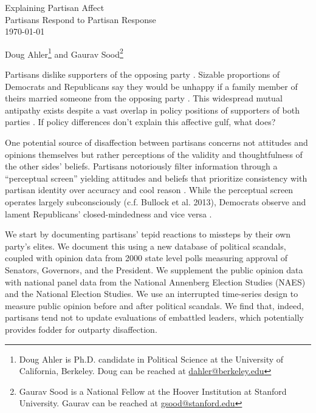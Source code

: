 \documentclass[12pt]{article}
\renewcommand{\thefootnote}{\fnsymbol{footnote}}
\begin{document}
\doublespacing
\vspace{2cm}

\begin{center}
Explaining Partisan Affect\\Partisans Respond to Partisan Response\\ 
\vspace{2cm}
\today\\\vspace{2cm}

Doug Ahler\footnote{Doug Ahler is Ph.D. candidate in Political Science at the
University of California, Berkeley. Doug can be reached at
\href{mailto:dahler@berkeley.edu}{dahler@berkeley.edu}} and Gaurav
Sood\footnote{Gaurav Sood is a National Fellow at the Hoover Institution at
Stanford University. Gaurav can be reached at
\href{mailto:gsood@stanford.edu}{gsood@stanford.edu}}

\end{center}

\setcounter{page}{0}
\thispagestyle{empty}
\renewcommand*{\thefootnote}{\arabic{footnote}}
\newpage
\setcounter{footnote}{1}

\newpage

Partisans dislike supporters of the opposing party \citep{iyengar2012,
iyengar2013}. Sizable proportions of Democrats and Republicans say they would be
unhappy if a family member of theirs married someone from the opposing party
\citep{iyengar2012}. This widespread mutual antipathy exists despite a vast overlap in policy positions of supporters of both parties \citep{fiorina2012}. If policy differences don't explain this affective gulf, what does?

One potential source of disaffection between partisans concerns not attitudes and opinions themselves but rather perceptions of the validity and thoughtfulness of the other sides' beliefs. Partisans notoriously filter information through a ``perceptual screen'' yielding attitudes and beliefs that prioritize consistency with partisan identity over accuracy and cool reason \citep{TAV,TAVR,Bartels2002}. While the perceptual screen operates largely subconsciously (c.f. Bullock et al. 2013), Democrats observe and lament Republicans' closed-mindedness and vice versa \citep{Haidt2011}.

We start by documenting partisans' tepid reactions to missteps by their own party's elites. We document this using a new database of political scandals, coupled with opinion data from 2000 state level polls measuring approval of Senators, Governors, and the President. We supplement the public opinion data with national panel data from the National Annenberg Election Studies (NAES) and the National Election Studies. We use an interrupted time-series design to measure public opinion before and after political scandals. We find that, indeed, partisans tend not to update evaluations of embattled leaders, which potentially provides fodder for outparty disaffection.
\end{document}
